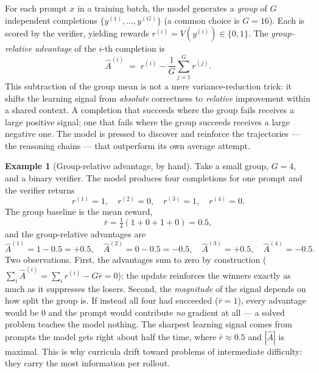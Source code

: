 \documentclass[11pt,a4paper]{article}
\theoremstyle{definition}
\newtheorem{example}[definition]{Example}
\theoremstyle{plain}
\begin{document}

For each prompt $x$ in a training batch, the model generates a \emph{group} of $G$ independent completions $\{y^{(1)}, \ldots, y^{(G)}\}$ (a common choice is $G=16$). Each is scored by the verifier, yielding rewards $r^{(i)} = V(y^{(i)}) \in \{0,1\}$. The \emph{group-relative advantage} of the $i$-th completion is
\begin{equation}
  \hat{A}^{(i)} \;=\; r^{(i)} - \frac{1}{G}\sum_{j=1}^{G} r^{(j)}.
\end{equation}
This subtraction of the group mean is not a mere variance-reduction trick: it shifts the learning signal from \emph{absolute} correctness to \emph{relative} improvement within a shared context. A completion that succeeds where the group fails receives a large positive signal; one that fails where the group succeeds receives a large negative one. The model is pressed to discover and reinforce the trajectories --- the reasoning chains --- that outperform its own average attempt.

\begin{example}[Group-relative advantage, by hand]
Take a small group, $G=4$, and a binary verifier. The model produces four
completions for one prompt and the verifier returns
\[
  r^{(1)}=1,\quad r^{(2)}=0,\quad r^{(3)}=1,\quad r^{(4)}=0.
\]
The group baseline is the mean reward,
\[
  \bar{r} = \tfrac{1}{4}(1+0+1+0) = 0.5,
\]
and the group-relative advantages are
\[
  \hat{A}^{(1)} = 1-0.5 = +0.5,\quad
  \hat{A}^{(2)} = 0-0.5 = -0.5,\quad
  \hat{A}^{(3)} = +0.5,\quad
  \hat{A}^{(4)} = -0.5.
\]
Two observations. First, the advantages sum to zero by construction
($\sum_i \hat{A}^{(i)} = \sum_i r^{(i)} - G\bar{r} = 0$); the update reinforces
the winners exactly as much as it suppresses the losers. Second, the
\emph{magnitude} of the signal depends on how split the group is. If instead
all four had succeeded ($\bar r = 1$), every advantage would be $0$ and the
prompt would contribute \emph{no} gradient at all --- a solved problem teaches
the model nothing. The sharpest learning signal comes from prompts the model
gets right about half the time, where $\bar r \approx 0.5$ and $|\hat A|$ is
maximal. This is why curricula drift toward problems of intermediate
difficulty: they carry the most information per rollout.
\end{example}

\end{document}
